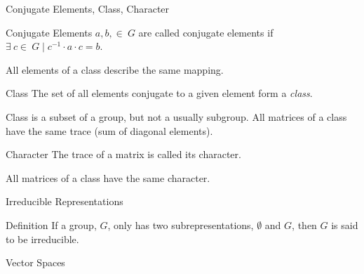 \documentclass{beamer}
\begin{document}
\begin{frame}{Conjugate Elements, Class, Character}
    \begin{block}{Conjugate Elements}
        $a, b, \in\ G$ are called conjugate elements if $\exists\ c \in\ G \mid c^{-1}\cdot a\cdot c = b$.
    \end{block}
    All elements of a class describe the same mapping.
    \begin{block}{Class}
        The set of all elements conjugate to a given element form a \emph{class}.
    \end{block}
    Class is a subset of a group, but not a usually subgroup.  All matrices of a class have the same trace (sum of diagonal elements).
    \begin{block}{Character}
        The trace of a matrix is called its character.
    \end{block}
    All matrices of a class have the same character.
\end{frame}

\begin{frame}{Irreducible Representations}
    \begin{block}{Definition}
         If a group, $G$, only has two subrepresentations, $\emptyset$ and $G$, then $G$ is said to be irreducible.
     \end{block}
\end{frame}


\begin{frame}{Vector Spaces}
\end{frame}
\end{document}
